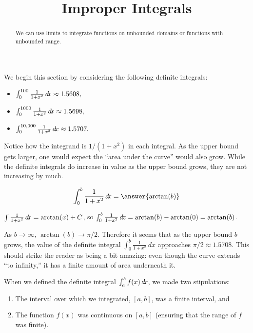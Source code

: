 \documentclass{ximera}
\title[Dig-In:]{Improper Integrals}
\begin{document}
\begin{abstract}
  We can use limits to integrate functions on unbounded domains or functions with unbounded range.
\end{abstract}
\maketitle

We begin this section by considering the following definite integrals:
\begin{itemize}
\item	$ \int_0^{100}\frac1{1+x^2} \mathop{}\!d\! x \approx 1.5608,$
\item	$ \int_0^{1000}\frac1{1+x^2} \mathop{}\!d\! x \approx 1.5698,$
\item	$ \int_0^{10,000}\frac1{1+x^2} \mathop{}\!d\! x \approx 1.5707.$
\end{itemize}

Notice how the integrand is $1/(1+x^2)$ in each integral. As the upper bound gets larger, one would expect the ``area under the curve'' would also grow. While the definite integrals do increase in value as the upper bound grows, they are not  increasing by much. 

\begin{question}

\[
\int_0^b \frac{1}{1+x^2} \d x =  \answer{\arctan(b)}
\]

\begin{hint}
	$\int \frac{1}{1+x^2} \mathop{}\!d\! x = \arctan(x)+C$, so $\int_0^b \frac{1}{1+x^2} \mathop{}\!d\! x = \arctan(b) -\arctan(0) = \arctan(b)$.
\end{hint}
\end{question}

As $b \rightarrow \infty$, $\arctan(b) \rightarrow \pi/2.$ Therefore it seems that as the upper bound $b$ grows, the value of the definite integral $ \int_0^b\frac{1}{1+x^2}\ dx$ approaches $\pi/2 \approx 1.5708$. This should strike the reader as being a bit amazing: even though the curve extends ``to infinity,'' it has a finite amount of area underneath it.



When we defined the definite integral $\int_a^b f(x) \mathop{}\!d\! x$, we made two stipulations:
	\begin{enumerate}
	\item		The interval over which we integrated, $[a,b]$, was a finite interval, and
	\item		The function $f(x)$ was continuous on $[a,b]$ (ensuring that the range of $f$ was finite).
	\end{enumerate}
	
\end{document}

